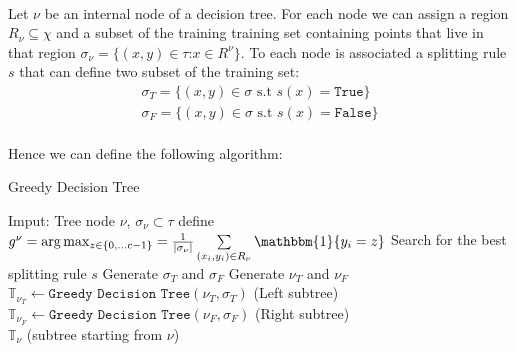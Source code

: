 \\
Let \(\nu\) be an internal node of a decision tree. For each node we can assign a region \(R_\nu \subseteq \chi \) and a subset of the training training set containing points that live in that region \(\sigma_\nu = \{(x, y) \in \tau
\text{:}  x \in R^\nu\}\). To each node is associated a splitting rule \(s\) that can define two subset of the training set:
\begin{eqnarray*}
    \sigma_T = \{(x, y) \in \sigma \text{ s.t } s(x) = \texttt{True}\}\\
    \sigma_F = \{(x, y) \in \sigma \text{ s.t } s(x) = \texttt{False}\}
\end{eqnarray*}
\\
Hence we can define the following algorithm:
\begin{algorithm}[H]\caption{Greedy Decision Tree}
    \label{algo:greedy}
    \begin{algorithmic}
    \State Imput: Tree node \(\nu\), \(\sigma_\nu \subset \tau\)
    \State define \(g^\nu = \arg\max_{z \in \{0, \dots c- 1\}} = \frac{1}{| \sigma_\nu |}  \sum \limits_{(x_i, y_i) \in R_\nu}^{} \mathbbm{1}\{y_i = z\} \)
    \EndIf
    \State Search for the best splitting rule \(s\)
    \State Generate \(\sigma_T\) and \(\sigma_F\)
    \State Generate \(\nu_T\) and \(\nu_F\)
    \State \(\mathbb{T}_{\nu_T} \gets \texttt{Greedy Decision Tree}(\nu_T, \sigma_T)\) (Left subtree)
    \State \(\mathbb{T}_{\nu_F} \gets \texttt{Greedy Decision Tree}(\nu_F, \sigma_F)\) (Right subtree)\\
    \Return \(\mathbb{T}_\nu\) (subtree starting from \(\nu\))
    \end{algorithmic}            
\end{algorithm}

